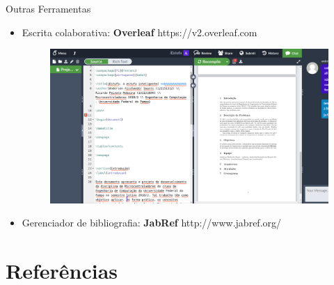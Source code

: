 \documentclass{beamer}
\begin{document}
\begin{frame}{Outras Ferramentas}
	
	\begin{itemize}
		\item Escrita colaborativa: \textbf{Overleaf} https://v2.overleaf.com \\
		
		\begin{figure}[!htb]
			\centering
			
			\includegraphics[scale=.15]{ov.png}
		\end{figure}
		
		
		\item Gerenciador de bibliografia: \textbf{JabRef} http://www.jabref.org/
		
	\end{itemize}

\end{frame}

\section{Referências}
	
\end{document}
